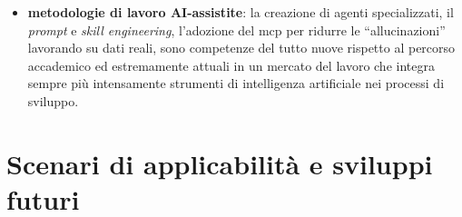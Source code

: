 \begin{itemize}
            \emph{factory} per la registrazione delle sorgenti nel \emph{pipeline}
            e dell'\emph{adapter} per integrare \emph{Serilog} con \gls{otel}, ha
            permesso di osservare in concreto come pattern studiati in modo
            astratto durante il corso di Ingegneria del Software trovino una loro
            naturale applicazione in un \emph{framework} condiviso;
      \item \textbf{metodologie di lavoro AI-assistite}: la creazione di agenti
            specializzati, il \emph{prompt} e \emph{skill engineering}, l'adozione
            del \gls{mcp} per ridurre le ``allucinazioni'' lavorando su dati reali,
            sono competenze del tutto nuove rispetto al percorso accademico ed
            estremamente attuali in un mercato del lavoro che integra sempre più
            intensamente strumenti di intelligenza artificiale nei processi di
            sviluppo.
\end{itemize}

\section{Scenari di applicabilità e sviluppi futuri}

